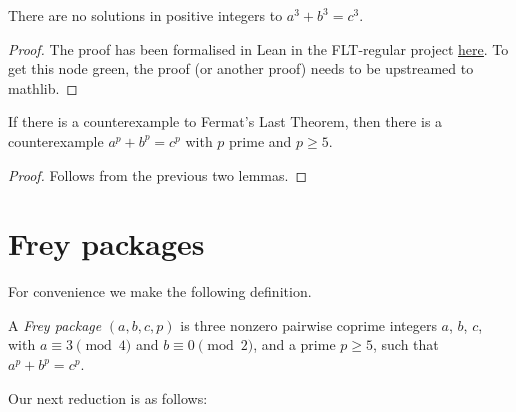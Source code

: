 \begin{lemma}\label{p_not_three}\leanok
{}
  There are no solutions in positive integers to $a^3+b^3=c^3$.
\end{lemma}
\begin{proof}
  The proof has been formalised in Lean in the FLT-regular project \href{https://github.com/leanprover-community/flt-regular/blob/861b7df057140b45b8bb7d30d33426ffbbdda52b/FltRegular/FltThree/FltThree.lean#L698}{\underline{here}}. To get this node green, the proof (or another proof) needs to be upstreamed to mathlib.
\end{proof}

\begin{corollary}\label{WLOG_p_ge_5}\leanok If there is a counterexample to Fermat's Last Theorem, then there is a counterexample $a^p+b^p=c^p$ with $p$ prime and $p\geq 5$.
\end{corollary}
\begin{proof}\leanok Follows from the previous two lemmas.\end{proof}

\section{Frey packages}

For convenience we make the following definition.

\begin{definition}\label{Frey_package}\leanok A \emph{Frey package} $(a,b,c,p)$ is three nonzero pairwise coprime integers $a$, $b$, $c$, with $a\equiv3\pmod4$ and $b\equiv0\pmod2$, and a prime $p\geq5$, such that $a^p+b^p=c^p$.\end{definition}

Our next reduction is as follows:

